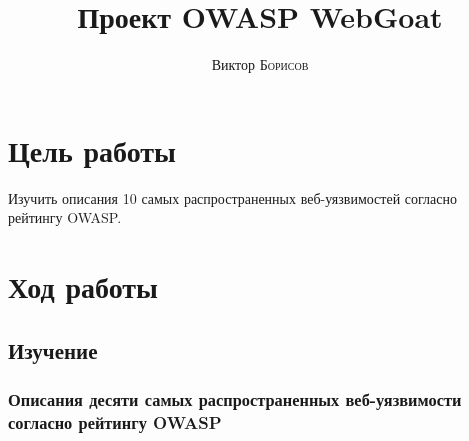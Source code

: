 \documentclass[10pt,a4paper]{article}
\title{Проект OWASP WebGoat} %
\author{Виктор \textsc{Борисов}} %
\begin{document}
\maketitle %

\newpage

\tableofcontents

\newpage


\section{Цель работы}

Изучить описания 10 самых распространенных веб-уязвимостей согласно рейтингу OWASP.

\section{Ход работы}

\subsection{Изучение}

\subsubsection{Описания десяти самых распространенных веб-уязвимости согласно рейтингу OWASP}
\end{document}
